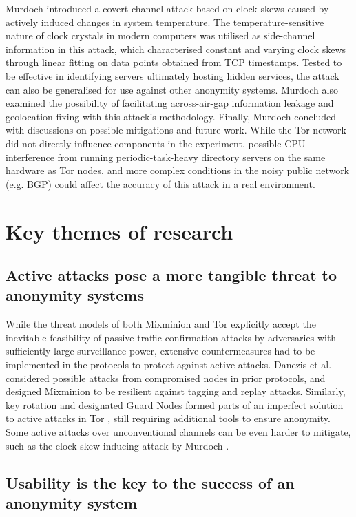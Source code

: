 \documentclass[11pt]{article}
\begin{document}
Murdoch \cite{murdoch2006hot} introduced a covert channel attack based on clock skews caused by actively induced changes in system temperature. The temperature-sensitive nature of clock crystals in modern computers was utilised as side-channel information in this attack, which characterised constant and varying clock skews through linear fitting on data points obtained from TCP timestamps. Tested to be effective in identifying servers ultimately hosting hidden services, the attack can also be generalised for use against other anonymity systems. Murdoch also examined the possibility of facilitating across-air-gap information leakage and geolocation fixing with this attack's methodology. Finally, Murdoch concluded with discussions on possible mitigations and future work. While the Tor network did not directly influence components in the experiment, possible CPU interference from running periodic-task-heavy directory servers on the same hardware as Tor nodes, and more complex conditions in the noisy public network (e.g. BGP) could affect the accuracy of this attack in a real environment.

\section{Key themes of research}

\subsection{Active attacks pose a more tangible threat to anonymity systems}

While the threat models of both Mixminion and Tor explicitly accept the inevitable feasibility of passive traffic-confirmation attacks by adversaries with sufficiently large surveillance power, extensive countermeasures had to be implemented in the protocols to protect against active attacks. Danezis et al. \cite[Sec. 2]{danezis2003mixminion} considered possible attacks from compromised nodes in prior protocols, and designed Mixminion to be resilient against tagging and replay attacks. Similarly, key rotation and designated Guard Nodes formed parts of an imperfect solution to active attacks in Tor \cite[Sec. 7]{dingledine2014tor}, still requiring additional tools to ensure anonymity. Some active attacks over unconventional channels can be even harder to mitigate, such as the clock skew-inducing attack by Murdoch \cite{murdoch2006hot}.

\subsection{Usability is the key to the success of an anonymity system}
\end{document}
